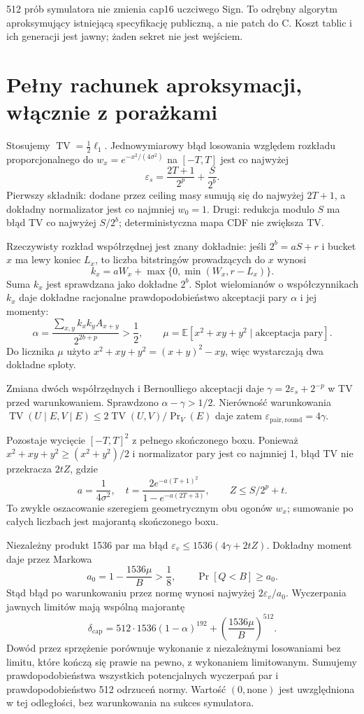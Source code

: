 \documentclass[11pt,a4paper]{article}
\newcommand{\TV}{\operatorname{TV}}
\newcommand{\E}{\mathbb E}
\begin{document}
512 prób symulatora nie zmienia cap16 uczciwego Sign. To odrębny algorytm
aproksymujący istniejącą specyfikację publiczną, a nie patch do C.
Koszt tablic i ich generacji jest jawny; żaden sekret nie jest wejściem.

\section{Pełny rachunek aproksymacji, włącznie z porażkami}
Stosujemy $\TV=\tfrac12\ell_1$.
Jednowymiarowy błąd losowania względem rozkładu proporcjonalnego do
$w_x=e^{-x^2/(4\sigma^2)}$ na $[-T,T]$ jest co najwyżej
\[
 \varepsilon_s=\frac{2T+1}{2^p}+\frac{S}{2^b}.
\]
Pierwszy składnik: dodane przez ceiling masy sumują się do najwyżej
$2T+1$, a dokładny normalizator jest co najmniej $w_0=1$.
Drugi: redukcja modulo $S$ ma błąd TV co najwyżej $S/2^b$;
deterministyczna mapa CDF nie zwiększa TV.

Rzeczywisty rozkład współrzędnej jest znany dokładnie: jeśli
$2^b=aS+r$ i bucket $x$ ma lewy koniec $L_x$, to liczba bitstringów
prowadzących do $x$ wynosi
\[
 k_x=aW_x+\max\{0,\min(W_x,r-L_x)\}.
\]
Suma $k_x$ jest sprawdzana jako dokładne $2^b$.
Splot wielomianów o współczynnikach $k_x$ daje dokładne racjonalne
prawdopodobieństwo akceptacji pary $\alpha$ i jej momenty:
\[
 \alpha=\frac{\sum_{x,y}k_xk_y A_{x+y}}{2^{2b+p}}>\frac12,
 \qquad \mu=\E[x^2+xy+y^2\mid\text{akceptacja pary}].
\]
Do licznika $\mu$ użyto
$x^2+xy+y^2=(x+y)^2-xy$, więc wystarczają dwa dokładne sploty.

Zmiana dwóch współrzędnych i Bernoulliego akceptacji daje
$\gamma=2\varepsilon_s+2^{-p}$ w TV przed warunkowaniem.
Sprawdzono $\alpha-\gamma>1/2$. Nierówność warunkowania
$\TV(U\mid E,V\mid E)\le2\TV(U,V)/\Pr_V(E)$ daje zatem
$\varepsilon_{\mathrm{pair,round}}=4\gamma$.

Pozostaje wycięcie $[-T,T]^2$ z pełnego skończonego boxu.
Ponieważ $x^2+xy+y^2\ge(x^2+y^2)/2$ i normalizator pary jest co najmniej 1,
błąd TV nie przekracza $2tZ$, gdzie
\[
 a=\frac1{4\sigma^2},\quad
 t=\frac{2e^{-a(T+1)^2}}{1-e^{-a(2T+3)}},\qquad
 Z\le S/2^p+t.
\]
To zwykłe oszacowanie szeregiem geometrycznym obu ogonów $w_x$;
sumowanie po całych liczbach jest majorantą skończonego boxu.

Niezależny produkt 1536 par ma błąd
$\varepsilon_v\le1536(4\gamma+2tZ)$.
Dokładny moment daje przez Markowa
\[
 a_0=1-\frac{1536\mu}{B}>\frac18,
 \qquad \Pr[Q<B]\ge a_0.
\]
Stąd błąd po warunkowaniu przez normę wynosi najwyżej
$2\varepsilon_v/a_0$. Wyczerpania jawnych limitów mają wspólną majorantę
\[
 \delta_{\mathrm{cap}}
 =512\cdot1536(1-\alpha)^{192}
   +\left(\frac{1536\mu}{B}\right)^{512}.
\]
Dowód przez sprzężenie porównuje wykonanie z niezależnymi losowaniami
bez limitu, które kończą się prawie na pewno, z wykonaniem limitowanym.
Sumujemy prawdopodobieństwa wszystkich potencjalnych wyczerpań par
i prawdopodobieństwo 512 odrzuceń normy. Wartość $(0,\mathrm{none})$
jest uwzględniona w tej odległości, bez warunkowania na sukces symulatora.
\end{document}
